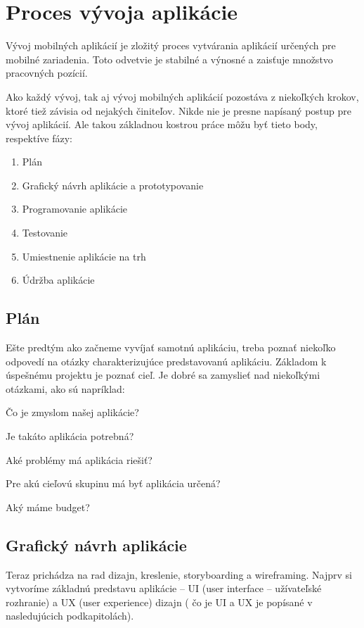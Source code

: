\documentclass[10pt,twoside,slovak,a4paper]{article}
\begin{document}
\section{Proces vývoja aplikácie}
\quad Vývoj mobilných aplikácií je zložitý proces vytvárania aplikácií určených pre mobilné zariadenia. Toto odvetvie je stabilné a výnosné a zaisťuje množstvo pracovných pozícií.

Ako každý vývoj, tak aj vývoj mobilných aplikácií pozostáva z niekoľkých krokov, ktoré tiež závisia od nejakých činiteľov. Nikde nie je presne napísaný postup pre vývoj aplikácií. Ale takou základnou kostrou práce môžu byť tieto body, respektíve fázy:

	\begin{enumerate}
	\item Plán
	\item Grafický návrh aplikácie a prototypovanie
	\item Programovanie aplikácie
	\item Testovanie
	\item Umiestnenie aplikácie na trh
	\item Údržba aplikácie
	\end{enumerate}



\subsection{Plán} \label{}
\quad Ešte predtým ako začneme vyvíjať samotnú aplikáciu, treba poznať niekoľko odpovedí na otázky charakterizujúce predstavovanú aplikáciu. Základom k úspešnému projektu je poznať cieľ. Je dobré sa zamyslieť nad niekoľkými otázkami, ako sú napríklad:

Čo je zmyslom našej aplikácie?

Je takáto aplikácia potrebná?

Aké problémy má aplikácia riešiť?

Pre akú cieľovú skupinu má byť aplikácia určená?

Aký máme budget?



\subsection{Grafický návrh aplikácie}
\quad Teraz prichádza na rad dizajn, kreslenie, storyboarding a wireframing. Najprv si vytvoríme základnú predstavu aplikácie – UI (user interface – užívateľské rozhranie) a UX (user experience) dizajn ( čo je UI a UX je popísané v nasledujúcich podkapitolách).
\end{document}
